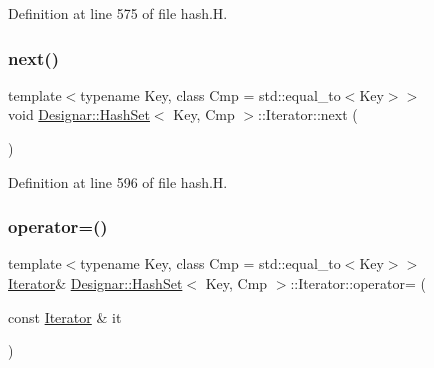 Definition at line 575 of file hash.\+H.

\mbox{\label{class_designar_1_1_hash_set_1_1_iterator_a13eaec913faa009d4d002c25965d67d7}} 
\subsubsection{\texorpdfstring{next()}{next()}}
{\footnotesize\ttfamily template$<$typename Key, class Cmp = std\+::equal\+\_\+to$<$\+Key$>$$>$ \\
void \hyperlink{class_designar_1_1_hash_set}{Designar\+::\+Hash\+Set}$<$ Key, Cmp $>$\+::Iterator\+::next (\begin{DoxyParamCaption}{ }\end{DoxyParamCaption})\hspace{0.3cm}{\ttfamily [inline]}}



Definition at line 596 of file hash.\+H.

\mbox{\label{class_designar_1_1_hash_set_1_1_iterator_a8e8fce4e60beb6933dd5d13b39d67493}} 
\subsubsection{\texorpdfstring{operator=()}{operator=()}\hspace{0.1cm}{\footnotesize\ttfamily [1/2]}}
{\footnotesize\ttfamily template$<$typename Key, class Cmp = std\+::equal\+\_\+to$<$\+Key$>$$>$ \\
\hyperlink{class_designar_1_1_hash_set_1_1_iterator}{Iterator}\& \hyperlink{class_designar_1_1_hash_set}{Designar\+::\+Hash\+Set}$<$ Key, Cmp $>$\+::Iterator\+::operator= (\begin{DoxyParamCaption}\item[{const \hyperlink{class_designar_1_1_hash_set_1_1_iterator}{Iterator} \&}]{it }\end{DoxyParamCaption})\hspace{0.3cm}{\ttfamily [inline]}}



